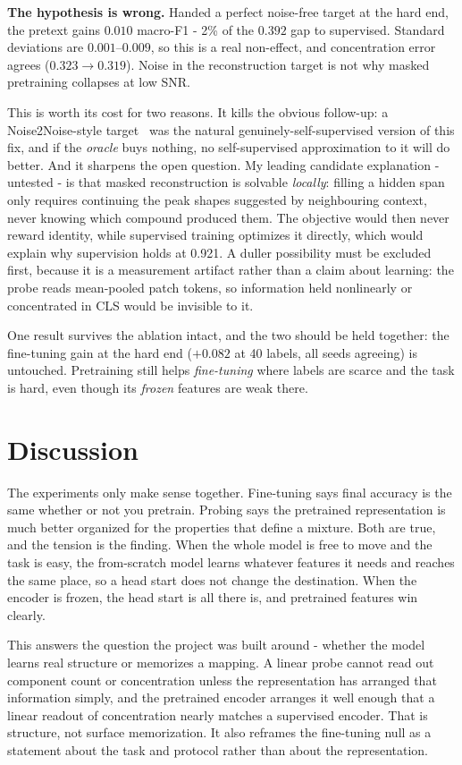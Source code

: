 \documentclass[11pt]{article}
\begin{document}
\textbf{The hypothesis is wrong.} Handed a perfect noise-free target at the hard end, the
pretext gains $0.010$ macro-F1 - 2\% of the $0.392$ gap to supervised. Standard deviations
are $0.001$--$0.009$, so this is a real non-effect, and concentration error agrees ($0.323 \to
0.319$). Noise in the reconstruction target is not why masked pretraining collapses at low SNR.

This is worth its cost for two reasons. It kills the obvious follow-up: a Noise2Noise-style
target~\cite{noise2noise} was the natural genuinely-self-supervised version of this fix, and if
the \emph{oracle} buys nothing, no self-supervised approximation to it will do better. And it
sharpens the open question. My leading candidate explanation - untested - is that masked
reconstruction is solvable \emph{locally}: filling a hidden span only requires continuing the
peak shapes suggested by neighbouring context, never knowing which compound produced them. The
objective would then never reward identity, while supervised training optimizes it directly,
which would explain why supervision holds at 0.921. A duller possibility must be excluded
first, because it is a measurement artifact rather than a claim about learning: the probe reads
mean-pooled patch tokens, so information held nonlinearly or concentrated in CLS would be
invisible to it.

One result survives the ablation intact, and the two should be held together: the fine-tuning
gain at the hard end ($+0.082$ at 40 labels, all seeds agreeing) is untouched. Pretraining
still helps \emph{fine-tuning} where labels are scarce and the task is hard, even though its
\emph{frozen} features are weak there.

\section{Discussion}

The experiments only make sense together. Fine-tuning says final accuracy is the same whether
or not you pretrain. Probing says the pretrained representation is much better organized for
the properties that define a mixture. Both are true, and the tension is the finding. When the
whole model is free to move and the task is easy, the from-scratch model learns whatever
features it needs and reaches the same place, so a head start does not change the destination.
When the encoder is frozen, the head start is all there is, and pretrained features win
clearly.

This answers the question the project was built around - whether the model learns real
structure or memorizes a mapping. A linear probe cannot read out component count or
concentration unless the representation has arranged that information simply, and the
pretrained encoder arranges it well enough that a linear readout of concentration nearly
matches a supervised encoder. That is structure, not surface memorization. It also reframes
the fine-tuning null as a statement about the task and protocol rather than about the
representation.
\end{document}
